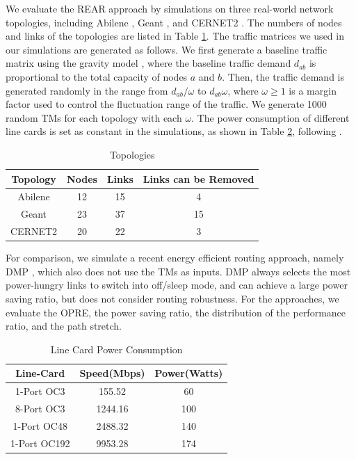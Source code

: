 \documentclass[conference]{IEEEtran}
\begin{document}
We evaluate the REAR approach by simulations on three real-world network topologies, including Abilene \cite{networking:abilene}, Geant \cite{networking:geant}, and CERNET2 \cite{networking:cernet2}. The numbers of nodes and links of the topologies are listed in Table \ref{three_topologies}. The traffic matrices we used in our simulations are generated as follows. We first generate a baseline traffic matrix using the gravity model \cite{networking:gravity}, where the baseline traffic demand $d_{ab}$ is proportional to the total capacity of nodes $a$ and $b$. Then, the traffic demand is generated randomly in the range from $d_{ab}/\omega$ to $d_{ab}\omega$, where $\omega \geq 1$ is a margin factor used to control the fluctuation range of the traffic. We generate 1000 random TMs for each topology with each $\omega$. The power consumption of different line cards is set as constant in the simulations, as shown in Table \ref{table_line_card_power_consumption}, following \cite{networking:greente}.

\begin{table}[h]
\renewcommand{\arraystretch}{1}
\caption{Topologies}
\label{three_topologies}
\centering
\begin{tabular}{|c|c|c|c|}
\hline
\bfseries Topology & \bfseries Nodes & \bfseries Links & \bfseries Links can be Removed \\
\hline
Abilene & 12 & 15 & 4 \\
\hline
Geant & 23 & 37 & 15 \\
\hline
CERNET2 & 20 & 22 & 3 \\
\hline
\end{tabular}
\end{table}

For comparison, we simulate a recent energy efficient routing approach, namely DMP \cite{networking:dmp}, which also does not use the TMs as inputs. DMP always selects the most power-hungry links to switch into off/sleep mode, and can achieve a large power saving ratio, but does not consider routing robustness. For the approaches, we evaluate the OPRE, the power saving ratio, the distribution of the performance ratio, and the path stretch.

\begin{table}[h]
\renewcommand{\arraystretch}{1}
\caption{Line Card Power Consumption}
\label{table_line_card_power_consumption}
\centering
\begin{tabular}{|c|c|c|}
\hline
\bfseries Line-Card & \bfseries Speed(Mbps) & \bfseries Power(Watts) \\
\hline
1-Port OC3 & 155.52 & 60 \\
\hline
8-Port OC3 & 1244.16 & 100 \\
\hline
1-Port OC48 & 2488.32 & 140 \\
\hline
1-Port OC192 & 9953.28 & 174 \\
\hline
\end{tabular}
\end{table}
\end{document}
